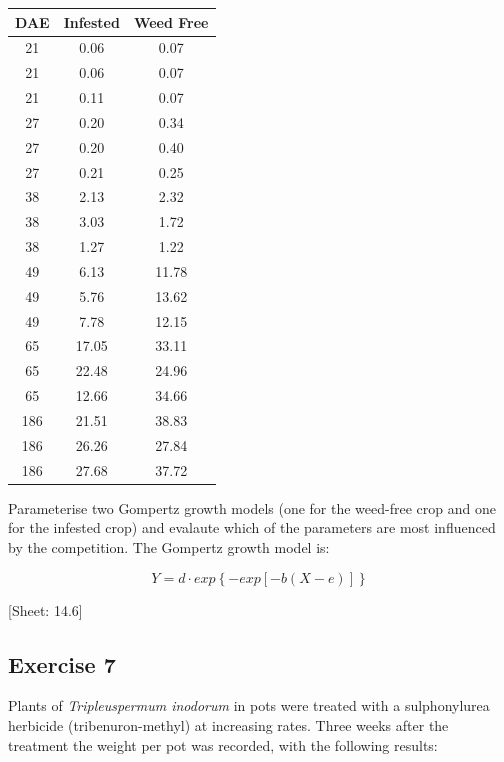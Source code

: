 \documentclass[a4paper,12pt,oneside]{book}
\begin{document}
\begin{longtable}[]{@{}ccc@{}}
\toprule()
DAE & Infested & Weed Free \\
\midrule()
\endhead
21 & 0.06 & 0.07 \\
21 & 0.06 & 0.07 \\
21 & 0.11 & 0.07 \\
27 & 0.20 & 0.34 \\
27 & 0.20 & 0.40 \\
27 & 0.21 & 0.25 \\
38 & 2.13 & 2.32 \\
38 & 3.03 & 1.72 \\
38 & 1.27 & 1.22 \\
49 & 6.13 & 11.78 \\
49 & 5.76 & 13.62 \\
49 & 7.78 & 12.15 \\
65 & 17.05 & 33.11 \\
65 & 22.48 & 24.96 \\
65 & 12.66 & 34.66 \\
186 & 21.51 & 38.83 \\
186 & 26.26 & 27.84 \\
186 & 27.68 & 37.72 \\
\bottomrule()
\end{longtable}

Parameterise two Gompertz growth models (one for the weed-free crop and one for the infested crop) and evalaute which of the parameters are most influenced by the competition. The Gompertz growth model is:

\[Y = d \cdot exp\left\{- exp \left[ - b (X - e)\right] \right\}\]

{[}Sheet: 14.6{]}

\hypertarget{exercise-7-1}{%
\subsection{Exercise 7}\label{exercise-7-1}}

Plants of \emph{Tripleuspermum inodorum} in pots were treated with a sulphonylurea herbicide (tribenuron-methyl) at increasing rates. Three weeks after the treatment the weight per pot was recorded, with the following results:
\end{document}
